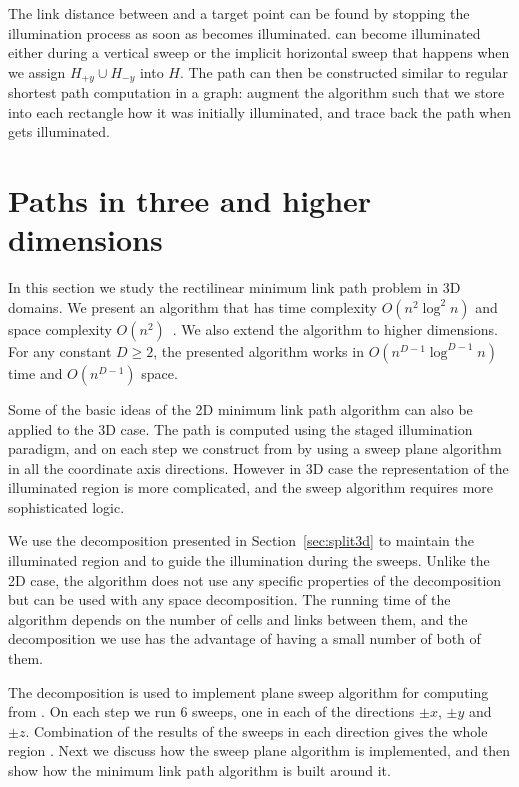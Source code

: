 \documentclass[english,gradu]{tktltiki2018}
\begin{document}
The link distance between \spt and a target point \ept can be found by stopping the illumination process as soon as \ept becomes illuminated.
\epts can become illuminated either during a vertical sweep or the implicit horizontal sweep that happens when we assign $H_{+y}\cup H_{-y}$ into $H$.
The path can then be constructed similar to regular shortest path computation in a graph:
augment the algorithm such that we store into each rectangle how it was initially illuminated, and trace back the path when \ept gets illuminated.



\section{Paths in three and higher dimensions}\label{sec:minlink3d}

In this section we study the rectilinear minimum link path problem in 3D domains.
We present an algorithm that has time complexity $O(n^2\log^2 n)$ and space complexity $O(n^2)$~\cite{restricted}.
We also extend the algorithm to higher dimensions.
For any constant $D\ge 2$, the presented algorithm works in $O(n^{D-1}\log^{D-1}n)$ time and $O(n^{D-1})$ space.

Some of the basic ideas of the 2D minimum link path algorithm can also be applied to the 3D case.
The path is computed using the staged illumination paradigm, and on each step we construct  from  by using a sweep plane algorithm in all the coordinate axis directions.
However in 3D case the representation of the illuminated region is more complicated, and the sweep algorithm requires more sophisticated logic.

We use the decomposition presented in Section~\ref{sec:split3d} to maintain the illuminated region and to guide the illumination during the sweeps.
Unlike the 2D case, the algorithm does not use any specific properties of the decomposition but can be used with any space decomposition.
The running time of the algorithm depends on the number of cells and links between them, and the decomposition we use has the advantage of having a small number of both of them.

The decomposition is used to implement plane sweep algorithm for computing  from .
On each step we run 6 sweeps, one in each of the directions $\pm x$, $\pm y$ and $\pm z$.
Combination of the results of the sweeps in each direction gives the whole region .
Next we discuss how the sweep plane algorithm is implemented, and then show how the minimum link path algorithm is built around it.
\end{document}
